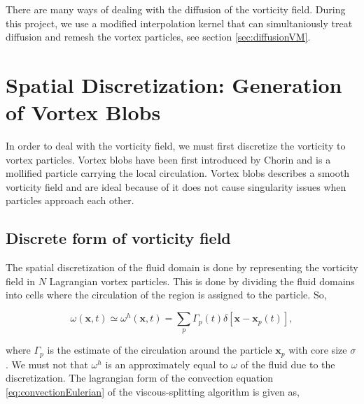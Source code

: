There are many ways of dealing with the diffusion of the vorticity field. During this project, we use a modified interpolation kernel \cite{Wee2006} that can simultaniously treat diffusion and remesh the vortex particles, see section \ref{sec:diffusionVM}.

\section{Spatial Discretization: Generation of Vortex Blobs}

In order to deal with the vorticity field, we must first discretize the vorticity to vortex particles. Vortex blobs have been first introduced by Chorin and is a mollified particle carrying the local circulation. Vortex blobs describes a smooth vorticity field and are ideal because of it does not cause singularity issues when particles approach each other.

\subsection{Discrete form of vorticity field}
The spatial discretization of the fluid domain is done by representing the vorticity field in $N$ Lagrangian vortex particles. This is done by dividing the fluid domains into cells where the circulation of the region is assigned to the particle. So,

	\begin{equation}
	\omega\left(\mathbf{x},t\right) \simeq \omega^h\left(\mathbf{x},t\right) = \sum_{p}\Gamma_p\left(t\right)\delta \left[\mathbf{x}-\mathbf{x}_p\left(t\right)\right],
	\end{equation}

where $\Gamma_p$ is the estimate of the circulation around the particle $\mathbf{x}_p$ with core size $\sigma$. We must not that $\omega^h$ is an approximately equal to $\omega$ of the fluid due to the discretization.
%
The lagrangian form of the convection equation \ref{eq:convectionEulerian} of the viscous-splitting algorithm is given as,

